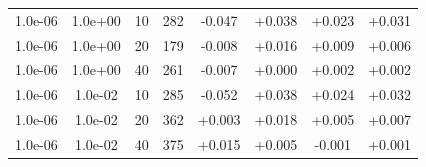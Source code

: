 \documentclass[11pt,a4paper]{article}
\begin{document}
\begin{table}
{\begin{tabular}{*{8}c}
   
   
   
 1.0e-06 	 & 1.0e+00 	 & 10 & 282 	 & -0.047 & +0.038 & +0.023 & +0.031 \\ 
  1.0e-06 	 & 1.0e+00 	 & 20 & 179 	 & -0.008 & +0.016 & +0.009 & +0.006 \\ 
  1.0e-06 	 & 1.0e+00 	 & 40 & 261 	 & -0.007 & +0.000 & +0.002 & +0.002 \\ 
 
  

 1.0e-06 	 & 1.0e-02 	 & 10 & 285 	 & -0.052 & +0.038 & +0.024 & +0.032 \\ 
 1.0e-06 	 & 1.0e-02 	 & 20 & 362 	 & +0.003 & +0.018 & +0.005 & +0.007 \\ 
 1.0e-06 	 & 1.0e-02 	 & 40 & 375 	 & +0.015 & +0.005 & -0.001 & +0.001 \\ 
\end{tabular}}
\label{TAB::double}
\end{table} 
\end{document}
